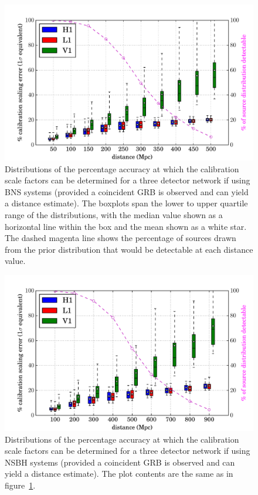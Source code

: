 \documentclass[prd, twocolumn, lengthcheck, superscriptaddress, showpacs, letterpaper, nofootinbib]{revtex4-1}
\begin{document}
\begin{figure}
 \begin{center}
  \includegraphics[width=1.0\textwidth]{scale_factor.pdf}
 \end{center}
 \caption{\label{fig:bnsresults} Distributions of the percentage accuracy at which the calibration 
scale factors can be determined for a three detector network if using
\ac{BNS} systems (provided a coincident \ac{GRB} is observed and can yield a
distance estimate). The boxplots span the lower to upper quartile range of the
distributions, with the median value shown as a horizontal line within the box
and the mean shown as a white star. The dashed magenta line shows the
percentage of sources drawn from the prior distribution that would be detectable
at each distance value.} 
\end{figure}

\begin{figure}
 \begin{center}
  \includegraphics[width=1.0\textwidth]{scale_factor_nsbh.pdf}
 \end{center}
 \caption{\label{fig:nsbhresults} Distributions of the percentage accuracy at which the calibration 
scale factors can be determined for a three detector network if using \ac{NSBH} systems 
(provided a coincident \ac{GRB} is observed and can yield a distance estimate). The plot contents 
are the same as in figure~\ref{fig:bnsresults}.}
\end{figure}
\end{document}
